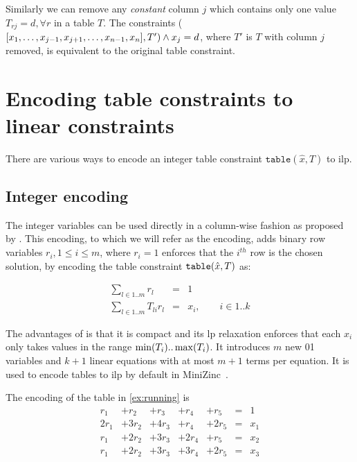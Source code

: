 \documentclass[a4paper,UKenglish,cleveref,autoref,thm-restate]{lipics-v2021}
\newcommand{\milp}{\gls{ilp}\xspace}
\newcommand{\relaxation}{\acrshort{lp} relaxation\xspace}
\begin{document}
Similarly we can remove any \textit{constant} column $j$ which contains only one value $T_{rj} = d, \forall r$ in a table $T$.
The constraints 
\ttable($[x_1, \ldots, x_{j-1}, x_{j+1}, \ldots, x_{n-1}, x_n], T') \wedge x_j = d$, where $T'$ is $T$ with column $j$ removed, is equivalent to the original table constraint. 

\section{Encoding table constraints to linear constraints}
\label{sec:encoding}

There are various ways to encode an integer table constraint $\texttt{table}(\hat{x},T)$ to \milp. 

\subsection{Integer encoding}
The integer variables can be used directly in a column-wise fashion as proposed by .
This encoding, to which we will refer as the \baseGleb encoding, adds binary row variables $r_i, 1 \leq i \leq m$, 
where $r_i = 1$ enforces that the $i^{th}$ row is the chosen solution, by encoding the table constraint $\texttt{table}(\hat{x},T)$ as:

\begin{eqnarray}
\sum_{l \in 1..m} r_l  &= &1 \label{simp:enc:1} \\
\sum_{l \in 1..m} T_{li} r_l &=& x_i, \quad\quad i \in 1..k  
\label{simp:enc:2}
\end{eqnarray}

The advantages of \baseGleb is that it is compact and its \relaxation enforces that each $x_i$ only takes values in the range $\min(T_i)..\max(T_i)$. 
It introduces $m$ new 01 variables and $k+1$ linear equations with at most $m+1$ terms per equation.
It is used to encode tables to \milp by default in MiniZinc~\cite{minizinc}.

\begin{example}
    The \baseGleb encoding of the table in \cref{ex:running} is 
    \begin{equation*}
        \begin{array}{rrrrrcl}
        r_1 &+ r_2& + r_3& + r_4& + r_5 &= &1 \\
        2 r_1& + 3r_2& + 4 r_3& + r_4& + 2r_5 &=& x_1 \\
        r_1& + 2r_2& + 3 r_3& + 2r_4&+ r_5 &=& x_2 \\
        r_1& + 2r_2& + 3 r_3& + 3r_4&+ 2r_5 &=& x_3\\
        \end{array}
    \end{equation*}
\end{example}
\end{document}
